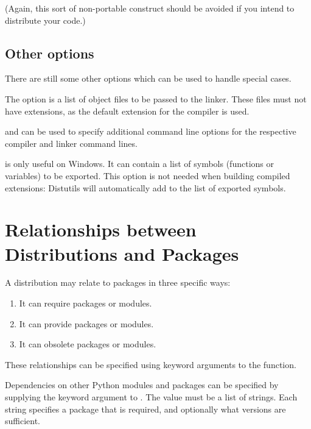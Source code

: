 \documentclass{manual}
\begin{document}
(Again, this sort of non-portable construct should be avoided if you
intend to distribute your code.)


\subsection{Other options}

There are still some other options which can be used to handle special
cases.

The  option is a list of object files to be passed
to the linker. These files must not have extensions, as the default
extension for the compiler is used.

 and  can be used
to specify additional command line options for the respective compiler and
linker command lines.

 is only useful on Windows.  It can contain a list
of symbols (functions or variables) to be exported. This option
is not needed when building compiled extensions: Distutils 
will automatically add 
to the list of exported symbols.

\section{Relationships between Distributions and Packages}

A distribution may relate to packages in three specific ways:

\begin{enumerate}
  \item It can require packages or modules.

  \item It can provide packages or modules.

  \item It can obsolete packages or modules.
\end{enumerate}

These relationships can be specified using keyword arguments to the
 function.

Dependencies on other Python modules and packages can be specified by
supplying the  keyword argument to .
The value must be a list of strings.  Each string specifies a package
that is required, and optionally what versions are sufficient.
\end{document}
